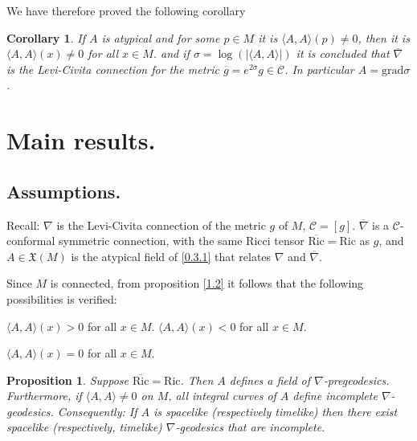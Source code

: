 \documentclass{amsart}%
\theoremstyle{plain}
\newtheorem{corollary}{Corollary}
\newtheorem{proposition}{Proposition}
\numberwithin{equation}{section}
\begin{document}
We have therefore proved the following corollary

\begin{corollary}
If $A$ is atypical and for some $p\in M$ it is $\langle A,A\rangle(p)\neq0$,
then it is $\langle A,A\rangle(x)\neq0$ for all $x\in M$. and if $\sigma
=\log(|\langle A,A\rangle|)$ it is concluded that $\overline{\nabla}$ is the
Levi-Civita connection for the metric $\overline{g}=e^{2\sigma}g\in
\mathcal{C}$. In particular $A=\mathrm{grad}\sigma$.
\end{corollary}

\section{Main results.}

\subsection{Assumptions.}

Recall: $\nabla$ is the Levi-Civita connection of the metric $g$ of $M$,
$\mathcal{C}=[g]$. $\overline{\nabla}$ is a $\mathcal{C}$-conformal symmetric
connection, with the same Ricci tensor $\overline{\mathrm{Ric}}=\mathrm{Ric}$
as $g$, and $A\in\mathfrak{X}(M)$ is the atypical field of \ref{0.3.1} that
relates $\nabla$ and $\overline{\nabla}$.

Since $M$ is connected, from proposition \ref{1.2} it follows that the
following possibilities is verified:

$\langle A,A\rangle(x)>0$ for all $x\in M$. $\langle A,A\rangle(x)<0$ for all
$x\in M$.

$\langle A,A\rangle(x)=0$ for all $x\in M$.

\begin{proposition}
\label{1.4}Suppose $\overline{\mathrm{Ric}}=\mathrm{Ric}$. Then $A$ defines a
field of $\nabla$-pregeodesics. Furthermore, if $\langle A,A\rangle\neq0$ on
$M$, all integral curves of $A$ define incomplete $\nabla$-geodesics.
Consequently: If $A$ is spacelike (respectively timelike) then there exist
spacelike (respectively, timelike) $\nabla$-geodesics that are incomplete.
\end{proposition}
\end{document}
